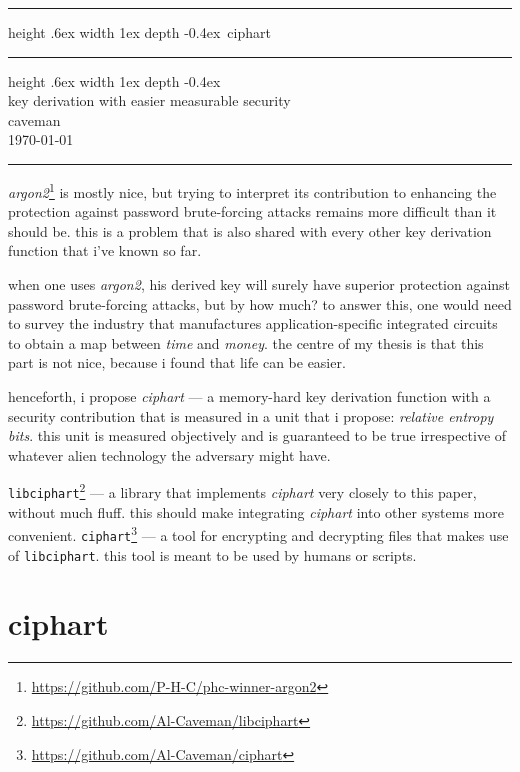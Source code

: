 \documentclass[twocolumn]{article}
\makeatletter
\def\myrulefill{\leavevmode\leaders\hrule height .6ex width 1ex depth -0.4ex\hfill\kern\z@}
\makeatother
\begin{document}

\begin{center}
\Huge
\myrulefill\ ciphart \myrulefill\\
\LARGE
key derivation with easier measurable security\\
\normalsize
caveman\\
\today\\
\rule{1\columnwidth}{2pt}
\end{center}

\emph{argon2}\footnote{\url{https://github.com/P-H-C/phc-winner-argon2}}
is mostly nice, but trying to interpret its contribution to enhancing the
protection against password brute-forcing attacks remains more difficult
than it should be.  this is a problem that is also shared with every other
key derivation function that i've known so far.

when one uses \emph{argon2}, his derived key will surely have superior
protection against password brute-forcing attacks, but by how much?  to
answer this, one would need to survey the industry that manufactures
application-specific integrated circuits to obtain a map between
\emph{time} and \emph{money}.  the centre of my thesis is that this part is
not nice, because i found that life can be easier.

henceforth, i propose \emph{ciphart} --- a memory-hard key derivation
function with a security contribution that is measured in a unit that i
propose: \emph{relative entropy bits}.  this unit is measured objectively
and is guaranteed to be true irrespective of whatever alien technology the
adversary might have.

\texttt{libciphart}\footnote{\url{https://github.com/Al-Caveman/libciphart}}
--- a library that implements \emph{ciphart} very closely to this paper,
without much fluff.  this should make integrating \emph{ciphart} into other
systems more convenient.
\texttt{ciphart}\footnote{\url{https://github.com/Al-Caveman/ciphart}} ---
a tool for encrypting and decrypting files that makes use of
\texttt{libciphart}.  this tool is meant to be used by humans or scripts.

\section{ciphart}
\end{document}
